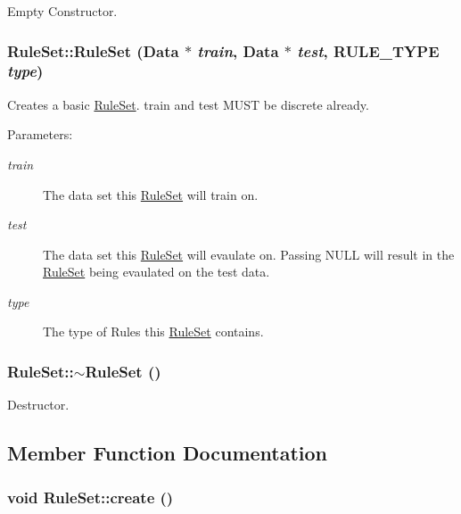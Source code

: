 Empty Constructor. \hypertarget{class_rule_set_ade3c40c3566785015423b68ec231610}{
\subsubsection{\setlength{\rightskip}{0pt plus 5cm}RuleSet::RuleSet ({\bf Data} $\ast$ {\em train}, \/  {\bf Data} $\ast$ {\em test}, \/  RULE\_\-TYPE {\em type})}}
\label{class_rule_set_ade3c40c3566785015423b68ec231610}


Creates a basic \hyperlink{class_rule_set}{RuleSet}. train and test MUST be discrete already. \begin{Desc}
\item[Parameters:]
\begin{description}
\item[{\em train}]The data set this \hyperlink{class_rule_set}{RuleSet} will train on. \item[{\em test}]The data set this \hyperlink{class_rule_set}{RuleSet} will evaulate on. Passing NULL will result in the \hyperlink{class_rule_set}{RuleSet} being evaulated on the test data. \item[{\em type}]The type of Rules this \hyperlink{class_rule_set}{RuleSet} contains. \end{description}
\end{Desc}
\hypertarget{class_rule_set_65703491de0805010c2deda1ee12cd4f}{
\subsubsection{\setlength{\rightskip}{0pt plus 5cm}RuleSet::$\sim$RuleSet ()}}
\label{class_rule_set_65703491de0805010c2deda1ee12cd4f}


Destructor. 

\subsection{Member Function Documentation}
\hypertarget{class_rule_set_a97d52f89a230fe24426c264daf28e9a}{
\subsubsection{\setlength{\rightskip}{0pt plus 5cm}void RuleSet::create ()}}
\label{class_rule_set_a97d52f89a230fe24426c264daf28e9a}


